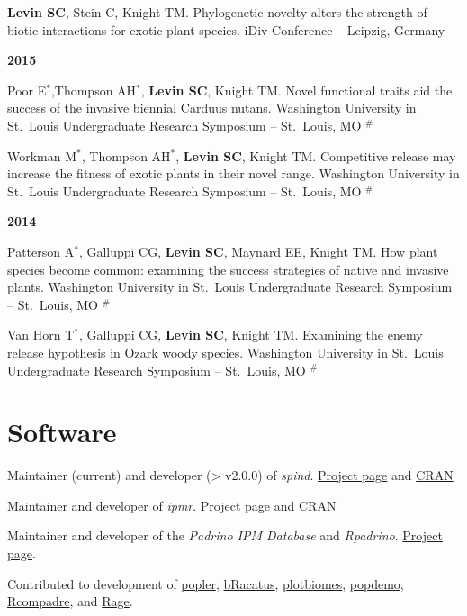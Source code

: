 \documentclass[11pt,]{article}
\begin{document}
\textbf{Levin SC}, Stein C, Knight TM. Phylogenetic novelty alters the
strength of biotic interactions for exotic plant species. iDiv
Conference -- Leipzig, Germany

\textbf{2015}

Poor E\(^\ast\),Thompson AH\(^\ast\), \textbf{Levin SC}, Knight TM.
Novel functional traits aid the success of the invasive biennial Carduus
nutans. Washington University in St.~Louis Undergraduate Research
Symposium -- St.~Louis, MO \(^\#\)

Workman M\(^\ast\), Thompson AH\(^\ast\), \textbf{Levin SC}, Knight TM.
Competitive release may increase the fitness of exotic plants in their
novel range. Washington University in St.~Louis Undergraduate Research
Symposium -- St.~Louis, MO \(^\#\)

\textbf{2014}

Patterson A\(^\ast\), Galluppi CG, \textbf{Levin SC}, Maynard EE, Knight
TM. How plant species become common: examining the success strategies of
native and invasive plants. Washington University in St.~Louis
Undergraduate Research Symposium -- St.~Louis, MO \(^\#\)

Van Horn T\(^\ast\), Galluppi CG, \textbf{Levin SC}, Knight TM.
Examining the enemy release hypothesis in Ozark woody species.
Washington University in St.~Louis Undergraduate Research Symposium --
St.~Louis, MO \(^\#\)

\hypertarget{software}{%
\section{Software}\label{software}}

Maintainer (current) and developer (\textgreater{} v2.0.0) of
\emph{spind}. \href{https://github.com/levisc8/spind}{Project page} and
\href{https://cran.r-project.org/package=spind}{CRAN}

Maintainer and developer of \emph{ipmr}.
\href{https://levisc8.github.io/ipmr/}{Project page} and
\href{https://cran.r-project.org/package=ipmr}{CRAN}

Maintainer and developer of the \emph{Padrino IPM Database} and
\emph{Rpadrino}. \href{https://levisc8.github.io/Padrino/}{Project
page}.

Contributed to development of
\href{https://github.com/AldoCompagnoni/popler}{popler},
\href{https://github.com/EduardoArle/bRacatus}{bRacatus},
\href{https://github.com/valentinitnelav/plotbiomes}{plotbiomes},
\href{https://github.com/iainmstott/popdemo}{popdemo},
\href{https://github.com/jonesor/Rcompadre}{Rcompadre}, and
\href{https://github.com/jonesor/Rage}{Rage}.
\end{document}
